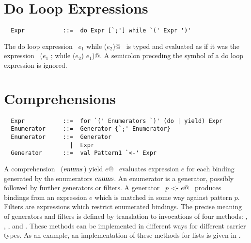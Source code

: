 \documentclass[a4paper,12pt,twoside,titlepage]{book}
\newcommand{\enums}{\mbox{\sl enums}}
\begin{document}
\section{Do Loop Expressions}

\syntax\begin{lstlisting}
  Expr           ::=  do Expr [`;'] while `(' Expr ')'
\end{lstlisting}

The do loop expression ~\lstinline@do $e_1$ while ($e_2$)@~ is typed and
evaluated as if it was the expression ~\lstinline@($e_1$ ; while ($e_2$) $e_1$)@.
A semicolon preceding the  symbol of a do loop expression is ignored.

\section{Comprehensions}

\syntax\begin{lstlisting}
  Expr           ::=  for `(' Enumerators `)' (do | yield) Expr
  Enumerator     ::=  Generator {`;' Enumerator}
  Enumerator     ::=  Generator
                   |  Expr
  Generator      ::=  val Pattern1 `<-' Expr
\end{lstlisting}

A comprehension ~\lstinline@for ($\enums\,$) yield $e$@~ evaluates expression $e$ for each
binding generated by the enumerators $\enums$. An enumerator is a generator,
possibly followed by further generators or filters.  A generator
~\lstinline@val $p$ <- $e$@~ produces bindings from an expression $e$ which is
matched in some way against pattern $p$. Filters are expressions which
restrict enumerated bindings. The precise meaning of generators and
filters is defined by translation to invocations of four methods:
, , , and . These
methods can be implemented in different ways for different carrier
types.  As an example, an implementation of these methods for lists is
given in .
\end{document}
